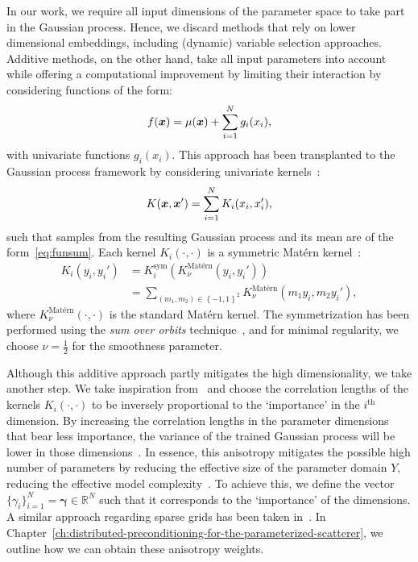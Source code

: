In our work, we require all input dimensions of the parameter space to take part in the Gaussian process.
Hence, we discard methods that rely on lower dimensional embeddings, including (dynamic) variable selection approaches.
Additive methods, on the other hand, take all input parameters into account while offering a computational improvement by limiting their interaction by considering functions of the form:
\begin{equation}
    f({{\bm{x}}}) = \mu({{\bm{x}}}) + \sum_{i=1}^N g_i(x_i)\label{eq:funsum},
\end{equation}
with univariate functions $g_i(x_i)$.
This approach has been transplanted to the Gaussian process framework by considering univariate kernels~\cite{duvenaud2011,neal1997}:
\begin{equation}
    K({{\bm{x}}}, {{\bm{x}}}') = \sum_{i=1}^N K_i(x_i, x_i')\label{eq:sumkernel},
\end{equation}
such that samples from the resulting Gaussian process and its mean are of the form~\eqref{eq:funsum}.
Each kernel $K_i(\cdot, \cdot)$ is a symmetric Matérn kernel~\cite{duvenaud2014}:
\begin{align}
    K_i(y_i, y_i') &= K^\text{sym}_i(K^{\text{Mat\'ern}}_{\nu}(y_i,y_i')) \\
    &= \sum_{(m_1,m_2)\in\left\{ -1, 1 \right\}^2}  K^{\text{Mat\'ern}}_{\nu}(m_1 y_i,m_2 y_i'),\label{eq:univariatekernel}
\end{align}
where $K^{\text{Mat\'ern}}_{\nu}(\cdot, \cdot)$ is the standard Matérn kernel.
The symmetrization has been performed using the \emph{sum over orbits} technique~\cite{duvenaud2014}, and for minimal regularity, we choose $\nu=\frac{1}{2}$ for the smoothness parameter.

Although this additive approach partly mitigates the high dimensionality, we take another step.
We take inspiration from~\cite{hvarfner2024} and choose the correlation lengths of the kernels $K_i(\cdot, \cdot)$ to be inversely proportional to the `importance' in the $i^\text{th}$ dimension.
By increasing the correlation lengths in the parameter dimensions that bear less importance, the variance of the trained Gaussian process will be lower in those dimensions~\cite{shende2022}.
In essence, this anisotropy mitigates the possible high number of parameters by reducing the effective size of the parameter domain $Y$, reducing the effective model complexity~\cite{hvarfner2024}.
To achieve this, we define the vector $\{\gamma_i\}_{i=1}^N=\bm{\gamma}\in\mathbb{R}^N$ such that it corresponds to the `importance' of the dimensions.
A similar approach regarding sparse grids has been taken in~\cite{addy2025}.
In Chapter~\ref{ch:distributed-preconditioning-for-the-parameterized-scatterer}, we outline how we can obtain these anisotropy weights.

